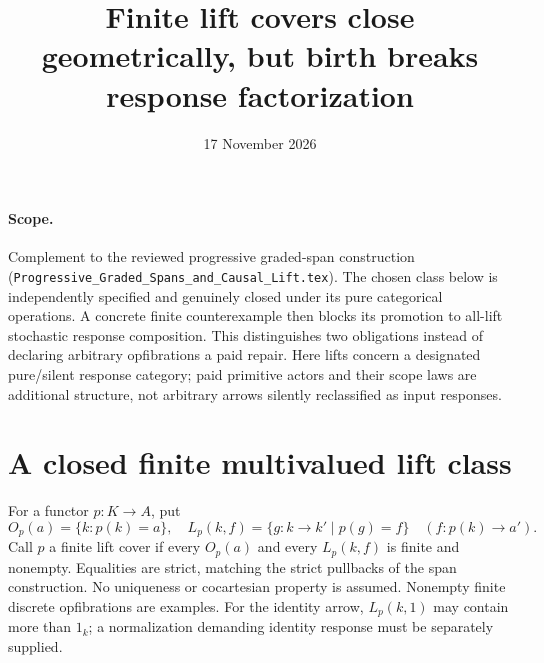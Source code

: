 \documentclass[11pt]{article}
\title{Finite lift covers close geometrically, but birth breaks response factorization}
\date{17 November 2026}
\begin{document}
\maketitle
\paragraph{Scope.} Complement to the reviewed progressive graded-span construction (\texttt{Progressive\_Graded\_Spans\_and\_Causal\_Lift.tex}). The chosen class below is independently specified and genuinely closed under its pure categorical operations. A concrete finite counterexample then blocks its promotion to all-lift stochastic response composition. This distinguishes two obligations instead of declaring arbitrary opfibrations a paid repair. Here lifts concern a designated pure/silent response category; paid primitive actors and their scope laws are additional structure, not arbitrary arrows silently reclassified as input responses.

\section{A closed finite multivalued lift class}
For a functor $p:K\to A$, put
\[
 O_p(a)=\{k:p(k)=a\},\quad
 L_p(k,f)=\{g:k\to k'\mid p(g)=f\}\quad(f:p(k)\to a').
\]
Call $p$ a finite lift cover if every $O_p(a)$ and every $L_p(k,f)$ is finite and nonempty. Equalities are strict, matching the strict pullbacks of the span construction. No uniqueness or cocartesian property is assumed. Nonempty finite discrete opfibrations are examples. For the identity arrow, $L_p(k,1)$ may contain more than $1_k$; a normalization demanding identity response must be separately supplied.
\end{document}
